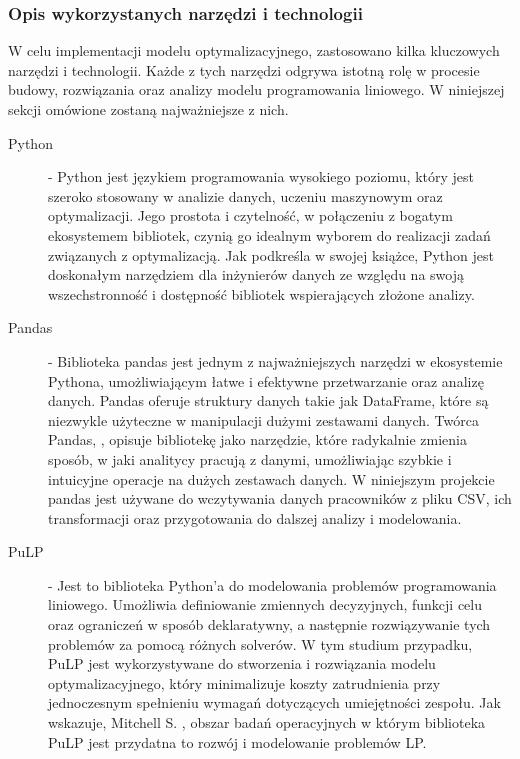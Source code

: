    \subsubsection{Opis wykorzystanych narzędzi i technologii}
    \par W celu implementacji modelu optymalizacyjnego, zastosowano kilka kluczowych narzędzi i technologii. Każde z tych narzędzi odgrywa istotną rolę w procesie budowy, rozwiązania oraz analizy modelu programowania liniowego. W niniejszej sekcji omówione zostaną najważniejsze z nich.
    \begin{description}
        
        \item[Python] - Python jest językiem programowania wysokiego poziomu, który jest szeroko stosowany w analizie danych, uczeniu maszynowym oraz optymalizacji. Jego prostota i czytelność, w połączeniu z bogatym ekosystemem bibliotek, czynią go idealnym wyborem do realizacji zadań związanych z optymalizacją. Jak podkreśla \parencite{lutz2013learning} w swojej książce, Python jest doskonałym narzędziem dla inżynierów danych ze względu na swoją wszechstronność i dostępność bibliotek wspierających złożone analizy.
        
        \item[Pandas] - Biblioteka pandas jest jednym z najważniejszych narzędzi w ekosystemie Pythona, umożliwiającym łatwe i efektywne przetwarzanie oraz analizę danych. Pandas oferuje struktury danych takie jak DataFrame, które są niezwykle użyteczne w manipulacji dużymi zestawami danych. Twórca Pandas, \parencite{mckinney2013python}, opisuje bibliotekę jako narzędzie, które radykalnie zmienia sposób, w jaki analitycy pracują z danymi, umożliwiając szybkie i intuicyjne operacje na dużych zestawach danych. W niniejszym projekcie pandas jest używane do wczytywania danych pracowników z pliku CSV, ich transformacji oraz przygotowania do dalszej analizy i modelowania.
        
        \item[PuLP] - Jest to biblioteka Python'a do modelowania problemów programowania liniowego. Umożliwia definiowanie zmiennych decyzyjnych, funkcji celu oraz ograniczeń w sposób deklaratywny, a następnie rozwiązywanie tych problemów za pomocą różnych solverów. W tym studium przypadku, PuLP jest wykorzystywane do stworzenia i rozwiązania modelu optymalizacyjnego, który minimalizuje koszty zatrudnienia przy jednoczesnym spełnieniu wymagań dotyczących umiejętności zespołu. Jak wskazuje, Mitchell S. \parencite{mitchell2009introduction}, obszar badań operacyjnych w którym biblioteka PuLP jest przydatna to rozwój i modelowanie problemów LP.
        

\end{description}
